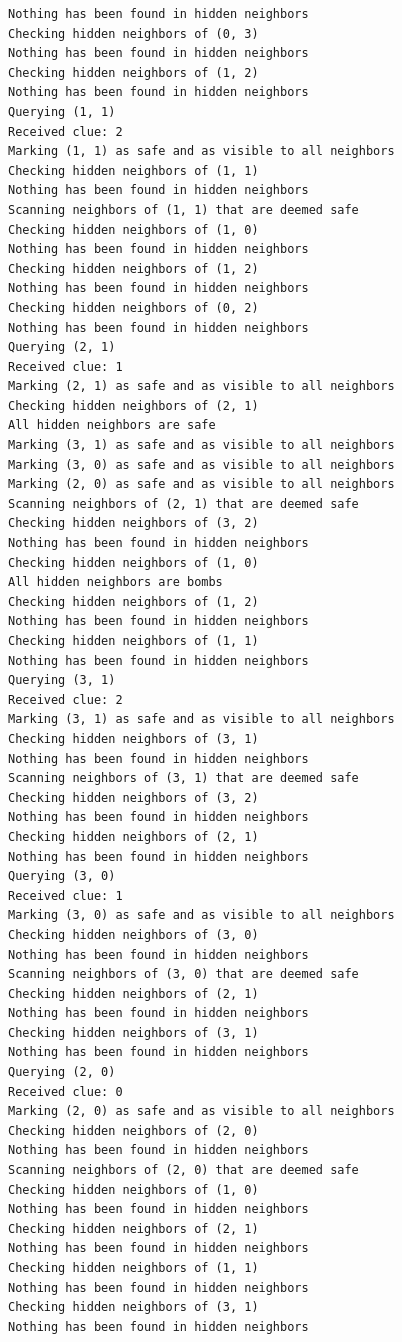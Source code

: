 \documentclass[13pt]{report}
\begin{document}
\begin{verbatim}
Nothing has been found in hidden neighbors
Checking hidden neighbors of (0, 3)
Nothing has been found in hidden neighbors
Checking hidden neighbors of (1, 2)
Nothing has been found in hidden neighbors
Querying (1, 1)
Received clue: 2
Marking (1, 1) as safe and as visible to all neighbors
Checking hidden neighbors of (1, 1)
Nothing has been found in hidden neighbors
Scanning neighbors of (1, 1) that are deemed safe
Checking hidden neighbors of (1, 0)
Nothing has been found in hidden neighbors
Checking hidden neighbors of (1, 2)
Nothing has been found in hidden neighbors
Checking hidden neighbors of (0, 2)
Nothing has been found in hidden neighbors
Querying (2, 1)
Received clue: 1
Marking (2, 1) as safe and as visible to all neighbors
Checking hidden neighbors of (2, 1)
All hidden neighbors are safe
Marking (3, 1) as safe and as visible to all neighbors
Marking (3, 0) as safe and as visible to all neighbors
Marking (2, 0) as safe and as visible to all neighbors
Scanning neighbors of (2, 1) that are deemed safe
Checking hidden neighbors of (3, 2)
Nothing has been found in hidden neighbors
Checking hidden neighbors of (1, 0)
All hidden neighbors are bombs
Checking hidden neighbors of (1, 2)
Nothing has been found in hidden neighbors
Checking hidden neighbors of (1, 1)
Nothing has been found in hidden neighbors
Querying (3, 1)
Received clue: 2
Marking (3, 1) as safe and as visible to all neighbors
Checking hidden neighbors of (3, 1)
Nothing has been found in hidden neighbors
Scanning neighbors of (3, 1) that are deemed safe
Checking hidden neighbors of (3, 2)
Nothing has been found in hidden neighbors
Checking hidden neighbors of (2, 1)
Nothing has been found in hidden neighbors
Querying (3, 0)
Received clue: 1
Marking (3, 0) as safe and as visible to all neighbors
Checking hidden neighbors of (3, 0)
Nothing has been found in hidden neighbors
Scanning neighbors of (3, 0) that are deemed safe
Checking hidden neighbors of (2, 1)
Nothing has been found in hidden neighbors
Checking hidden neighbors of (3, 1)
Nothing has been found in hidden neighbors
Querying (2, 0)
Received clue: 0
Marking (2, 0) as safe and as visible to all neighbors
Checking hidden neighbors of (2, 0)
Nothing has been found in hidden neighbors
Scanning neighbors of (2, 0) that are deemed safe
Checking hidden neighbors of (1, 0)
Nothing has been found in hidden neighbors
Checking hidden neighbors of (2, 1)
Nothing has been found in hidden neighbors
Checking hidden neighbors of (1, 1)
Nothing has been found in hidden neighbors
Checking hidden neighbors of (3, 1)
Nothing has been found in hidden neighbors

\end{verbatim}
\end{document}
